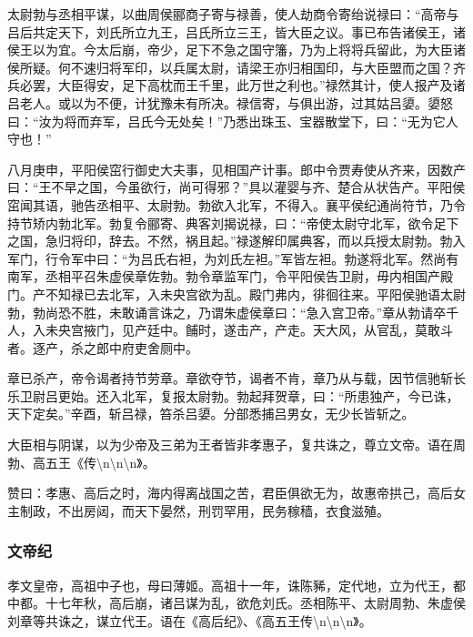 \documentclass[]{article}
\begin{document}
太尉勃与丞相平谋，以曲周侯郦商子寄与禄善，使人劫商令寄绐说禄曰：``高帝与吕后共定天下，刘氏所立九王，吕氏所立三王，皆大臣之议。事已布告诸侯王，诸侯王以为宜。今太后崩，帝少，足下不急之国守籓，乃为上将将兵留此，为大臣诸侯所疑。何不速归将军印，以兵属太尉，请梁王亦归相国印，与大臣盟而之国？齐兵必罢，大臣得安，足下高枕而王千里，此万世之利也。''禄然其计，使人报产及诸吕老人。或以为不便，计犹豫未有所决。禄信寄，与俱出游，过其姑吕嬃。嬃怒曰：``汝为将而弃军，吕氏今无处矣！''乃悉出珠玉、宝器散堂下，曰：``无为它人守也！''

八月庚申，平阳侯窋行御史大夫事，见相国产计事。郎中令贾寿使从齐来，因数产曰：``王不早之国，今虽欲行，尚可得邪？''具以灌婴与齐、楚合从状告产。平阳侯窋闻其语，驰告丞相平、太尉勃。勃欲入北军，不得入。襄平侯纪通尚符节，乃令持节矫内勃北军。勃复令郦寄、典客刘揭说禄，曰：``帝使太尉守北军，欲令足下之国，急归将印，辞去。不然，祸且起。''禄遂解印属典客，而以兵授太尉勃。勃入军门，行令军中曰：``为吕氏右袒，为刘氏左袒。''军皆左袒。勃遂将北军。然尚有南军，丞相平召朱虚侯章佐勃。勃令章监军门，令平阳侯告卫尉，毋内相国产殿门。产不知禄已去北军，入未央宫欲为乱。殿门弗内，徘徊往来。平阳侯驰语太尉勃，勃尚恐不胜，未敢诵言诛之，乃谓朱虚侯章曰：``急入宫卫帝。''章从勃请卒千人，入未央宫掖门，见产廷中。餔时，遂击产，产走。天大风，从官乱，莫敢斗者。逐产，杀之郎中府吏舍厕中。

章已杀产，帝令谒者持节劳章。章欲夺节，谒者不肯，章乃从与载，因节信驰斩长乐卫尉吕更始。还入北军，复报太尉勃。勃起拜贺章，曰：``所患独产，今已诛，天下定矣。''辛酉，斩吕禄，笞杀吕嬃。分部悉捕吕男女，无少长皆斩之。

大臣相与阴谋，以为少帝及三弟为王者皆非孝惠子，复共诛之，尊立文帝。语在周勃、高五王《传\textbackslash{}n\textbackslash{}n\textbackslash{}n》。

赞曰：孝惠、高后之时，海内得离战国之苦，君臣俱欲无为，故惠帝拱己，高后女主制政，不出房闼，而天下晏然，刑罚罕用，民务稼穑，衣食滋殖。

\hypertarget{header-n207}{%
\subsubsection{文帝纪}\label{header-n207}}

孝文皇帝，高祖中子也，母曰薄姬。高祖十一年，诛陈豨，定代地，立为代王，都中都。十七年秋，高后崩，诸吕谋为乱，欲危刘氏。丞相陈平、太尉周勃、朱虚侯刘章等共诛之，谋立代王。语在《高后纪》、《高五王传\textbackslash{}n\textbackslash{}n\textbackslash{}n》。
\end{document}
